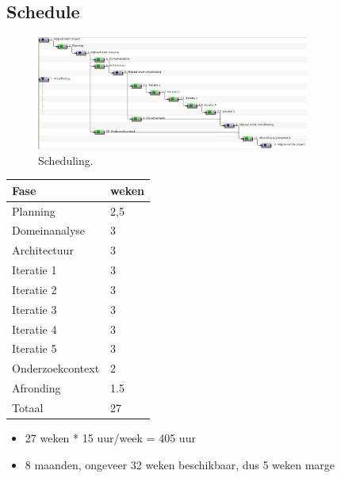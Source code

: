 

\subsection{Schedule}
  

  \begin{figure}
  	\centering
  	\includegraphics[width=0.8\textwidth,natwidth=1306,natheight=543]{Gantt.png}
  	\caption{\label{fig:Gantt Chart}Scheduling.}
  \end{figure}

\begin{tabular}{ll}\hline
{\bf Fase}    & {\bf weken}\\\hline
Planning             & 2,5 \\

Domeinanalyse        & 3 \\
Architectuur         & 3 \\

Iteratie 1           & 3 \\
Iteratie 2           & 3 \\
Iteratie 3           & 3 \\
Iteratie 4           & 3 \\
Iteratie 5           & 3 \\

Onderzoekcontext     &	2 \\

Afronding	     & 1.5 \\
\hline
Totaal               & 27 \\
\end{tabular}



\begin{itemize}
 \item 27 weken * 15 uur/week = 405 uur
 \item 8 maanden, ongeveer 32 weken beschikbaar, dus 5 weken marge
\end{itemize}



